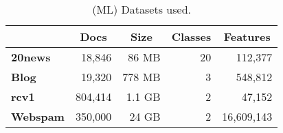 \begin{table}[t]
\centering
{\small
\begin{tabular}{|l|r|r|r|r|}
    \hline
    & \multicolumn{1}{c|}{\textbf{Docs}}
    & \multicolumn{1}{c|}{\textbf{Size}}
    & \multicolumn{1}{c|}{\textbf{Classes}}
    & \multicolumn{1}{c|}{\textbf{Features}}\\
    \hline
    \textbf{20news}  & 18,846     & 86 MB  & 20 & 112,377 \\
    \textbf{Blog}    & 19,320     & 778 MB & 3  & 548,812 \\
    \textbf{rcv1}    & 804,414    & 1.1 GB & 2  & 47,152 \\
    \textbf{Webspam} & 350,000    & 24 GB  & 2  & 16,609,143 \\
    \hline
\end{tabular}
}
\caption{(ML) Datasets used.}
\label{table:ml-datasets}
\end{table}
